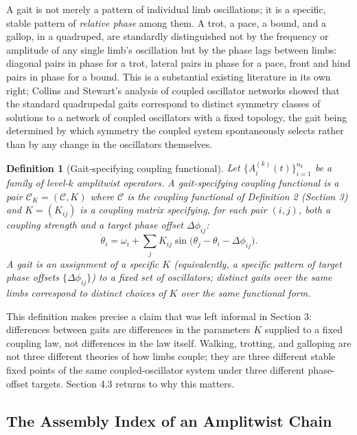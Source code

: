 \documentclass[12pt]{article}
\newtheorem{definition}{Definition}
\begin{document}
A gait is not merely a pattern of individual limb oscillations; it is a specific, stable pattern of \emph{relative phase} among them. A trot, a pace, a bound, and a gallop, in a quadruped, are standardly distinguished not by the frequency or amplitude of any single limb's oscillation but by the phase lags between limbs: diagonal pairs in phase for a trot, lateral pairs in phase for a pace, front and hind pairs in phase for a bound. This is a substantial existing literature in its own right; Collins and Stewart's analysis of coupled oscillator networks showed that the standard quadrupedal gaits correspond to distinct symmetry classes of solutions to a network of coupled oscillators with a fixed topology, the gait being determined by which symmetry the coupled system spontaneously selects rather than by any change in the oscillators themselves.

\begin{definition}[Gait-specifying coupling functional]
Let $\{A_i^{(k)}(t)\}_{i=1}^{n_k}$ be a family of level-$k$ amplitwist operators. A \emph{gait-specifying coupling functional} is a pair $\mathcal{C}_K = (\mathcal{C}, K)$ where $\mathcal{C}$ is the coupling functional of Definition 2 (Section 3) and $K = (K_{ij})$ is a coupling matrix specifying, for each pair $(i,j)$, both a coupling strength and a target phase offset $\Delta\phi_{ij}$:
\[
\dot\theta_i = \omega_i + \sum_j K_{ij} \sin\big(\theta_j - \theta_i - \Delta\phi_{ij}\big).
\]
A \emph{gait} is an assignment of a specific $K$ (equivalently, a specific pattern of target phase offsets $\{\Delta\phi_{ij}\}$) to a fixed set of oscillators; distinct gaits over the same limbs correspond to distinct choices of $K$ over the same functional form.
\end{definition}

This definition makes precise a claim that was left informal in Section 3: differences between gaits are differences in the parameters $K$ supplied to a fixed coupling law, not differences in the law itself. Walking, trotting, and galloping are not three different theories of how limbs couple; they are three different stable fixed points of the same coupled-oscillator system under three different phase-offset targets. Section 4.3 returns to why this matters.

\subsection{The Assembly Index of an Amplitwist Chain}
\end{document}
